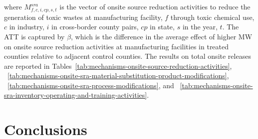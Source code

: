 \documentclass[12pt, english]{article}
\begin{document}
    where $M_{f,c,i,cp,s,t}^{sra}$ is the vector of onsite source reduction activities to reduce the generation of toxic wastes at manufacturing facility, $f$ through toxic chemical use, $c$ in industry, $i$ in cross-border county pairs, $cp$ in state, $s$ in the year, $t$. The ATT is captured by $\beta$, which is the difference in the average effect of higher MW on onsite source reduction activities at manufacturing facilities in treated counties relative to adjacent control counties. The results on total onsite releases are reported in Tables~\ref{tab:mechanisms-onsite-source-reduction-activities}, ~\ref{tab:mechanisms-onsite-sra-material-substitution-product-modifications}, ~\ref{tab:mechanisms-onsite-sra-process-modifications}, and ~\ref{tab:mechanisms-onsite-sra-inventory-operating-and-training-activities}.
    
    
    
    


    \section{Conclusions}\label{sec:conclusions}

    \newpage
\end{document}
